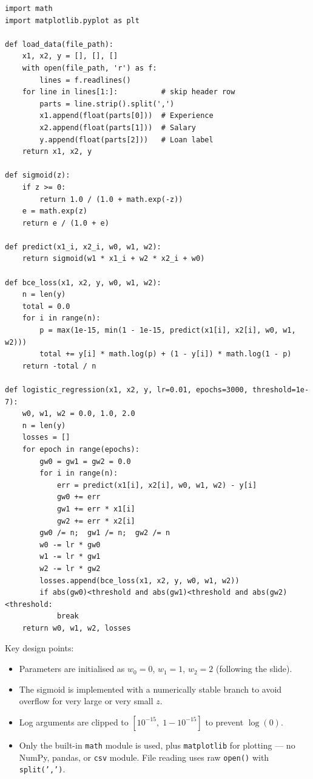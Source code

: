 \documentclass[12pt,a4paper]{article}
\begin{document}
\begin{lstlisting}[caption={Logistic Regression from Scratch}]
import math
import matplotlib.pyplot as plt

def load_data(file_path):
    x1, x2, y = [], [], []
    with open(file_path, 'r') as f:
        lines = f.readlines()
    for line in lines[1:]:          # skip header row
        parts = line.strip().split(',')
        x1.append(float(parts[0]))  # Experience
        x2.append(float(parts[1]))  # Salary
        y.append(float(parts[2]))   # Loan label
    return x1, x2, y

def sigmoid(z):
    if z >= 0:
        return 1.0 / (1.0 + math.exp(-z))
    e = math.exp(z)
    return e / (1.0 + e)

def predict(x1_i, x2_i, w0, w1, w2):
    return sigmoid(w1 * x1_i + w2 * x2_i + w0)

def bce_loss(x1, x2, y, w0, w1, w2):
    n = len(y)
    total = 0.0
    for i in range(n):
        p = max(1e-15, min(1 - 1e-15, predict(x1[i], x2[i], w0, w1, w2)))
        total += y[i] * math.log(p) + (1 - y[i]) * math.log(1 - p)
    return -total / n

def logistic_regression(x1, x2, y, lr=0.01, epochs=3000, threshold=1e-7):
    w0, w1, w2 = 0.0, 1.0, 2.0
    n = len(y)
    losses = []
    for epoch in range(epochs):
        gw0 = gw1 = gw2 = 0.0
        for i in range(n):
            err = predict(x1[i], x2[i], w0, w1, w2) - y[i]
            gw0 += err
            gw1 += err * x1[i]
            gw2 += err * x2[i]
        gw0 /= n;  gw1 /= n;  gw2 /= n
        w0 -= lr * gw0
        w1 -= lr * gw1
        w2 -= lr * gw2
        losses.append(bce_loss(x1, x2, y, w0, w1, w2))
        if abs(gw0)<threshold and abs(gw1)<threshold and abs(gw2)<threshold:
            break
    return w0, w1, w2, losses
\end{lstlisting}

Key design points:
\begin{itemize}
    \item Parameters are initialised as $w_0 = 0$, $w_1 = 1$, $w_2 = 2$ (following the slide).
    \item The sigmoid is implemented with a numerically stable branch to avoid overflow for very large or very small $z$.
    \item Log arguments are clipped to $[10^{-15},\; 1-10^{-15}]$ to prevent $\log(0)$.
    \item Only the built-in \texttt{math} module is used, plus \texttt{matplotlib} for plotting --- no NumPy, pandas, or \texttt{csv} module. File reading uses raw \texttt{open()} with \texttt{split(',')}.
\end{itemize}
\end{document}

